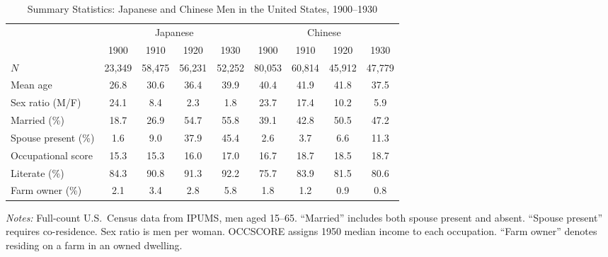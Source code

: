 \begin{table}[t]
\centering
\caption{Summary Statistics: Japanese and Chinese Men in the United States, 1900--1930}
\label{tab:summary}
\begin{threeparttable}
\small
\begin{tabular}{lcccccccc}
\toprule
 & \multicolumn{4}{c}{Japanese} & \multicolumn{4}{c}{Chinese} \\
\cmidrule(lr){2-5} \cmidrule(lr){6-9}
 & 1900 & 1910 & 1920 & 1930 & 1900 & 1910 & 1920 & 1930 \\
\midrule
$N$ & 23,349 & 58,475 & 56,231 & 52,252 & 80,053 & 60,814 & 45,912 & 47,779 \\
Mean age & 26.8 & 30.6 & 36.4 & 39.9 & 40.4 & 41.9 & 41.8 & 37.5 \\
Sex ratio (M/F) & 24.1 & 8.4 & 2.3 & 1.8 & 23.7 & 17.4 & 10.2 & 5.9 \\
Married (\%) & 18.7 & 26.9 & 54.7 & 55.8 & 39.1 & 42.8 & 50.5 & 47.2 \\
Spouse present (\%) & 1.6 & 9.0 & 37.9 & 45.4 & 2.6 & 3.7 & 6.6 & 11.3 \\
Occupational score & 15.3 & 15.3 & 16.0 & 17.0 & 16.7 & 18.7 & 18.5 & 18.7 \\
Literate (\%) & 84.3 & 90.8 & 91.3 & 92.2 & 75.7 & 83.9 & 81.5 & 80.6 \\
Farm owner (\%) & 2.1 & 3.4 & 2.8 & 5.8 & 1.8 & 1.2 & 0.9 & 0.8 \\
\bottomrule
\end{tabular}
\begin{tablenotes}[flushleft]
\footnotesize
\item \textit{Notes:} Full-count U.S.\ Census data from IPUMS, men aged 15--65. ``Married'' includes both spouse present and absent. ``Spouse present'' requires co-residence. Sex ratio is men per woman. OCCSCORE assigns 1950 median income to each occupation. ``Farm owner'' denotes residing on a farm in an owned dwelling.
\end{tablenotes}
\end{threeparttable}
\end{table}
